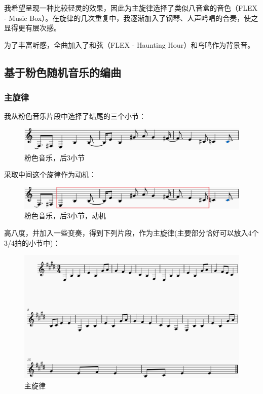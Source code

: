 \documentclass[a4paper,12pt]{article} %
\begin{document}
我希望呈现一种比较轻灵的效果，因此为主旋律选择了类似八音盒的音色（FLEX - Music Box）。在旋律的几次重复中，我逐渐加入了钢琴、人声吟唱的合奏，使之显得更有层次感。

为了丰富听感，全曲加入了和弦（FLEX - Haunting Hour）和鸟鸣作为背景音。


\subsection{基于粉色随机音乐的编曲}
\subsubsection{主旋律}
我从粉色音乐片段中选择了结尾的三个小节：
\begin{figure}[H]
    \centering
    \includegraphics[width=0.8\linewidth]{images/Pink-motive-1.png}
    \caption{粉色音乐，后3小节}
    \label{fig:enter-label}
\end{figure}

采取中间这个旋律作为动机：
\begin{figure}[H]
    \centering
    \includegraphics[width=0.8\linewidth]{images/Pink-motive-2.png}
    \caption{粉色音乐，后3小节，动机}
    \label{fig:enter-label}
\end{figure}

高八度，并加入一些变奏，得到下列片段，作为主旋律(主要部分恰好可以放入4个3/4拍的小节中)：
\begin{figure}[H]
    \centering
    \includegraphics[width=1.0\linewidth]{images/Pink-main.png}
    \caption{主旋律}
    \label{fig:enter-label}
\end{figure}
\end{document}
